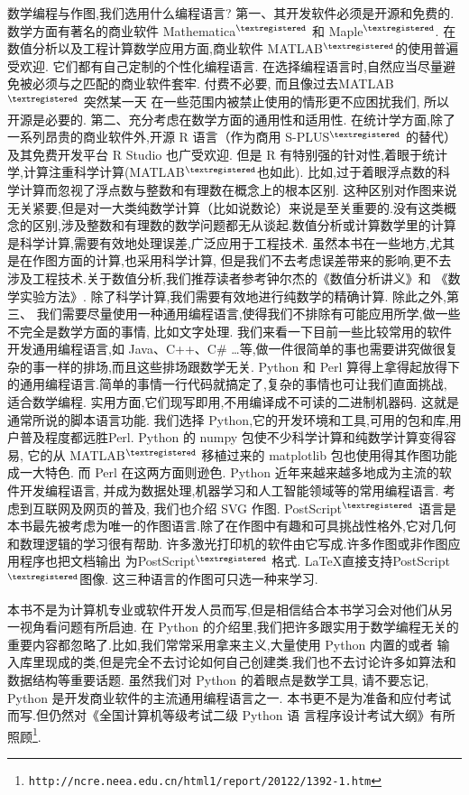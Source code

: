 数学编程与作图,我们选用什么编程语言?
第一、其开发软件必须是开源和免费的.
数学方面有著名的商业软件 Mathematica${}^{\textregistered}$ 和 Maple${}^{\textregistered}$.
在数值分析以及工程计算数学应用方面,商业软件 MATLAB${}^{\textregistered}$的使用普遍受欢迎.
它们都有自己定制的个性化编程语言.
在选择编程语言时,自然应当尽量避免被必须与之匹配的商业软件套牢.
付费不必要, 而且像过去MATLAB${}^{\textregistered}$ 突然某一天
在一些范围内被禁止使用的情形更不应困扰我们, 所以开源是必要的.
第二、充分考虑在数学方面的通用性和适用性.
在统计学方面,除了一系列昂贵的商业软件外,开源 R 语言（作为商用 S-PLUS${}^{\textregistered}$ 的替代）及其免费开发平台 R Studio 也广受欢迎.
但是 R 有特别强的针对性,着眼于统计学,计算注重科学计算(MATLAB${}^{\textregistered}$也如此).
比如,过于着眼浮点数的科学计算而忽视了浮点数与整数和有理数在概念上的根本区别.
这种区别对作图来说无关紧要,但是对一大类纯数学计算（比如说数论）来说是至关重要的.没有这类概念的区别,涉及整数和有理数的数学问题都无从谈起.数值分析或计算数学里的计算是科学计算,需要有效地处理误差,广泛应用于工程技术.
虽然本书在一些地方,尤其是在作图方面的计算,也采用科学计算,
但是我们不去考虑误差带来的影响,更不去涉及工程技术.关于数值分析,我们推荐读者参考钟尔杰的《数值分析讲义》\cite{ZhongEr1}和
《数学实验方法》\cite{ZhongEr2}.
除了科学计算,我们需要有效地进行纯数学的精确计算.
除此之外,第三、
我们需要尽量使用一种通用编程语言,使得我们不排除有可能应用所学,做一些不完全是数学方面的事情, 比如文字处理.
我们来看一下目前一些比较常用的软件开发通用编程语言,如 Java、C++、C\# …等,做一件很简单的事也需要讲究做很复杂的事一样的排场,而且这些排场跟数学无关. 
Python 和 Perl 算得上拿得起放得下的通用编程语言.简单的事情一行代码就搞定了,复杂的事情也可让我们直面挑战, 适合数学编程.
实用方面,它们现写即用,不用编译成不可读的二进制机器码.
这就是通常所说的脚本语言功能.
我们选择 Python,它的开发环境和工具,可用的包和库,用户普及程度都远胜Perl. Python 的 numpy 包使不少科学计算和纯数学计算变得容易, 它的从 MATLAB${}^{\textregistered}$ 移植过来的 matplotlib 包也使用得其作图功能成一大特色. 而 Perl 在这两方面则逊色. 
Python 近年来越来越多地成为主流的软件开发编程语言,
并成为数据处理,机器学习和人工智能领域等的常用编程语言.
考虑到互联网及网页的普及, 我们也介绍 SVG 作图. PostScript${}^{\textregistered}$ 语言是本书最先被考虑为唯一的作图语言.除了在作图中有趣和可具挑战性格外,它对几何和数理逻辑的学习很有帮助.
许多激光打印机的软件由它写成.许多作图或非作图应用程序也把文档输出
为PostScript${}^{\textregistered}$ 格式. \LaTeX 直接支持PostScript${}^{\textregistered}$图像.
这三种语言的作图可只选一种来学习.

本书不是为计算机专业或软件开发人员而写,但是相信结合本书学习会对他们从另一视角看问题有所启迪.
在 Python 的介绍里,我们把许多跟实用于数学编程无关的重要内容都忽略了.比如,我们常常采用拿来主义,大量使用 Python 内置的或者
输入库里现成的类,但是完全不去讨论如何自己创建类.我们也不去讨论许多如算法和数据结构等重要话题. 虽然我们对 Python 的着眼点是数学工具,
请不要忘记, Python 是开发商业软件的主流通用编程语言之一.
本书更不是为准备和应付考试而写.但仍然对《全国计算机等级考试二级 Python 语 言程序设计考试大纲》有所照顾\footnote{\texttt{http://ncre.neea.edu.cn/html1/report/20122/1392-1.htm}}.

